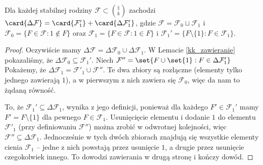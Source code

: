 \begin{lemma}
	\label{kk_suma}
	Dla każdej stabilnej rodziny $\mathcal F\subset \binom{\natural}{k}$ zachodzi
	$\card{\Delta\mathcal F} = \card{\mathcal F'_1} + \card{\Delta\mathcal
			F'_1}$, gdzie $\mathcal F = \mathcal F_0 \sqcup \mathcal F_1$ i $\mathcal F_0
		= \{F \in \mathcal F : 1 \notin F\}$ oraz $\mathcal F_1 = \{F \in \mathcal F
		: 1 \in F\}$ i $\mathcal F_1' = \{F \setminus \{1\} : F \in \mathcal F_1\}$.
\end{lemma}
\begin{proof}
	Oczywiście mamy $\Delta\mathcal F = \Delta\mathcal F_0 \cup \Delta\mathcal
		F_1$. W Lemacie \ref{kk_zawieranie} pokazaliśmy, że $\Delta\mathcal F_0
		\subseteq \mathcal F_1'$. Niech $\mathcal F'' = \set{F\cup\set{1} :
			F\in\Delta \mathcal F'_1}$ Pokażemy, że $\Delta\mathcal F_1 = \mathcal
		F'_1\cup \mathcal F''$. Te dwa zbiory są rozłączne (elementy tylko jednego
	zawierają $1$), a w pierwszym z nich zawiera się $\mathcal F_0$, więc da nam
	to żądaną równość.

	To, że $\mathcal F_1' \subseteq \Delta\mathcal F_1$, wynika z jego definicji,
	ponieważ dla każdego $F' \in \mathcal F_1'$ mamy $F' = F \setminus \{1\}$ dla
	pewnego $F \in \mathcal F_1$. Usunięcięcie elementu i dodanie $1$ do elementu
	$\mathcal F'_1$ (przy definiowaniu $\mathcal F''$) można zrobić w odwrotnej
	kolejności, więc $\mathcal F''\subseteq \Delta\mathcal F_1$. Jednocześnie w
	tych dwóch zbiorach znajdują się wszystkie elementy cienia $\mathcal F_1$ --
	jedne z nich powstają przez usunięcie $1$, a drugie przez usunięcie
	czegokolwiek innego. To dowodzi zawierania w drugą stronę i kończy dowód.
\end{proof}


